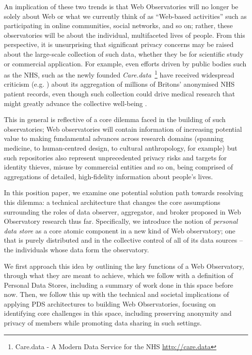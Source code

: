 \documentclass{acm_proc_article-sp}
\begin{document}
An implication of these two trends is that Web Observatories will no longer be solely about Web or what we currently think of as ``Web-based activities'' such as participating in online communities, social networks, and so on; rather, these observatories will be about the individual, multifaceted lives of people. From this perspective, it is unsurprising that significant privacy concerns may be raised about the large-scale collection of such data, whether they be for scientific study or commercial application. For example, even efforts driven by public bodies such as the NHS, such as the newly founded \emph{Care.data}~\footnote{Care.data - A Modern Data Service for the NHS \url{http://care.data}} have received widespread criticism (e.g. \cite{RameshNHS}) about its aggregation of millions of Britons' anonymised NHS patient records, even though such collection could drive medical research that might greatly advance the collective well-being \cite{de2006use}.

This in general is reflective of a core dilemma faced in the building of such observatories; Web observatories will contain information of increasing potential value to making fundamental advances across research domains (spanning medicine, to human-centred design, to cultural anthropology, for example) but such repositories also represent unprecedented privacy risks and targets for identity thieves, misuse by commercial entities and so on, being comprised of aggregations of detailed, high-fidelity information about people's lives. 

In this position paper, we examine one potential solution path towards resolving this dilemma: a technical architecture that changes the core assumptions surrounding the roles of data observer, aggregator, and broker proposed in Web Observatory research thus far. Specifically, we introduce the notion of \emph{personal data store} as a core atomic component in a new kind of Web observatory; one that is purely distributed and in the collective control of all of its data sources -- the individuals whose data form the observatory. 

We first approach this idea by outlining the key functions of a Web Observatory, through what they are meant to achieve, which we follow with a definition of Personal Data Stores, including a summary of work done in this space before now. Then, we follow this up with the technical and societal implications of applying PDS architectures to building Web Observatories, focusing on identifying core challenges in this space, including preserving anonymity and privacy of members while promoting data sharing in such settings.
\end{document}
